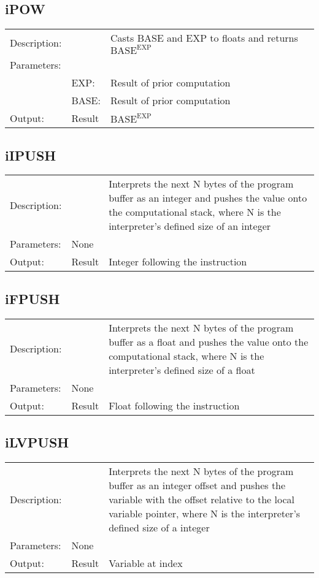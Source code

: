 \documentclass{report}
\begin{document}
\subsection{iPOW}
\begin{tabular}{l l p{10cm}}
Description: & ~    & Casts BASE and EXP to floats and returns $\text{BASE}^{\text{EXP}}$\\
Parameters:  & ~ & ~ \\
~			 & EXP: & Result of prior computation\\
~			 & BASE: & Result of prior computation\\
Output:      & Result & $\text{BASE}^{\text{EXP}}$\\
\end{tabular}

\subsection{iIPUSH}
\begin{tabular}{l l p{10cm}}
Description: & ~    & Interprets the next N bytes of the program buffer as an integer and pushes the value onto the computational stack, where N is the interpreter's defined size of an integer\\
Parameters:  & None & ~ \\
Output:      & Result & Integer following the instruction\\
\end{tabular}

\subsection{iFPUSH}
\begin{tabular}{l l p{10cm}}
Description: & ~    & Interprets the next N bytes of the program buffer as a float and pushes the value onto the computational stack, where N is the interpreter's defined size of a float\\
Parameters:  & None & ~ \\
Output:      & Result & Float following the instruction\\
\end{tabular}

\subsection{iLVPUSH}
\begin{tabular}{l l p{10cm}}
Description: & ~    & Interprets the next N bytes of the program buffer as an integer offset and pushes the variable with the offset relative to the local variable pointer, where N is the interpreter's defined size of a integer \\
Parameters:  & None & ~ \\
Output:      & Result & Variable at index\\
\end{tabular}
\end{document}
